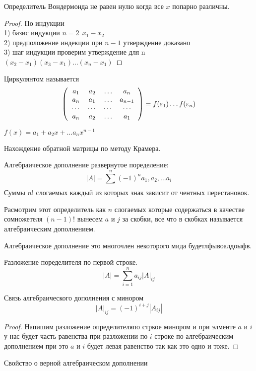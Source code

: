   Определитель Вондермонда не равен нулю когда все $x$ попарно различны.
\begin{proof}
  По индукции\\
  1) базис индукции $n = 2 ~~ x_1 - x_2$\\
  2) предположение индекции при $n-1$ утверждение доказано\\
  3) шаг индукции проверим утверждение для n\\
  $(x_2 - x_1)(x_3 - x_1) \ldots (x_n - x_1)$
\end{proof}

  Циркулянтом называется
\begin{displaymath}
  \left( \begin{array}{cccc}
    a_1 & a_2 & \ldots & a_{n} \\
    a_n & a_1 & \ldots & a_{n-1} \\
    \cdots & \cdots & \cdots & \cdots\\
    a_n & a_2 & \ldots & a_1
  \end{array}\right)
  = f(\varepsilon_1) \ldots f(\varepsilon_n)\\
\end{displaymath}

  $f(x) = a_1 +a_2x + \ldots a_n x^{n-1}$

  Нахождение обратной матрицы по методу Крамера.

  Алгебраическое дополнение развернутое поределение:
$$
|A| = \sum_{}^n (-1)^{n} a_1, a_2, \ldots a_i
$$
Суммы $n!$ слогаемых каждый из которых знак зависит от чентных перестановок.

  Расмотрим этот определитель как $n$ слогаемых которые содержаться в качестве
сомножетеля $(n-1)!$ вынесем $a$ и $j$ за скобки, все что в скобках называется
алгебраическим дополнением.

  Алгебраическое дополнение это многочлен некоторого мида будетлфывоалдоыфв.

  Разложение поределителя по первой строке.
$$
|A| = \sum_{i=1}^n a_{ij} |A|_{ij}
$$

  Связь алгебраического дополнения с минором
$$
|A|_{ij} = (-1)^{i+j} |A_{ij}|
$$

\begin{proof}
  Напишим разложение определителяпо стркое минором и при элменте $a$ и $i$ у нас
  будет часть равенства при разложении по $i$ строке по алгебраическим
  дополнением при это $a$ и $i$ будет левая равенство так как это одно и тоже.
\end{proof}

  Свойство о верной алгебраическом дополнении